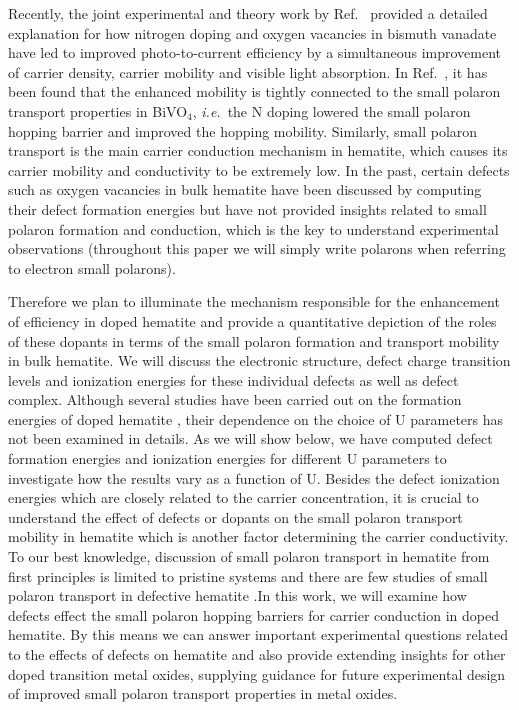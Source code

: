 Recently, the joint experimental and theory work by Ref.~\cite{kim2015simultaneous} provided a detailed explanation for how nitrogen doping and oxygen vacancies in bismuth vanadate have led to improved photo-to-current efficiency by a simultaneous improvement of carrier density, carrier mobility and visible light absorption. In Ref.~\cite{kim2015simultaneous}, it has been found that the enhanced mobility is tightly connected to the small polaron transport properties in BiVO$_4$, \textit{i.e.}\ the N doping lowered the small polaron hopping barrier and improved the hopping mobility. Similarly, small polaron transport is the main carrier conduction mechanism in hematite, which causes its carrier mobility and conductivity to be extremely low. In the past, certain defects such as oxygen vacancies in bulk hematite have been discussed by computing their defect formation energies \cite{lee2013thermodynamics,zhou2015understanding} but have not provided insights related to small polaron formation and conduction, which is the key to understand experimental observations (throughout this paper we will simply write polarons when referring to electron small polarons).

Therefore we plan to illuminate the mechanism responsible for the enhancement of efficiency in doped hematite and provide a quantitative depiction of the roles of these dopants in terms of the small polaron formation and transport mobility in bulk hematite. We will discuss the electronic structure, defect charge transition levels and ionization energies for these individual defects as well as defect complex. Although several studies have been carried out on the formation energies of doped hematite \cite{lee2013thermodynamics,zhou2015understanding}, their dependence on the choice of U parameters has not been examined in details. As we will show below, we have computed defect formation energies and ionization energies for different U parameters to investigate how the results vary as a function of U. Besides the defect ionization energies which are closely related to the carrier concentration, it is crucial to understand the effect of defects or dopants on the small polaron transport mobility in hematite which is another factor determining the carrier conductivity. To our best knowledge, discussion of small polaron transport in hematite from first principles is limited to pristine systems and there are few studies of small polaron transport in defective hematite \cite{liao2011electron}.In this work, we will examine how defects effect the small polaron hopping barriers for carrier conduction in doped hematite.
By this means we can answer important experimental questions related to the effects of defects on hematite and also provide extending insights for other doped transition metal oxides, supplying guidance for future experimental design of improved small polaron transport properties in metal oxides.


